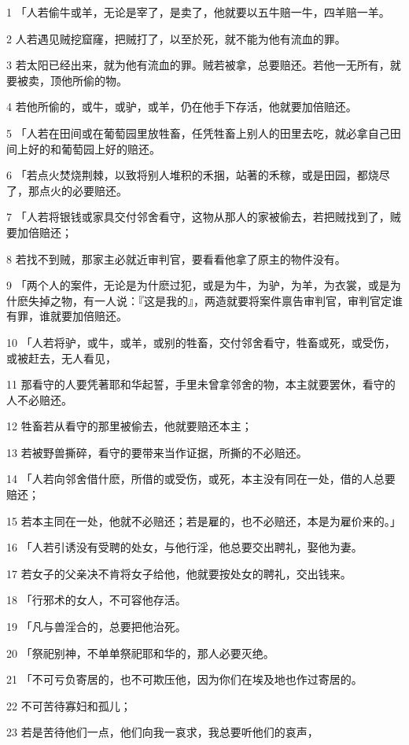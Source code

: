 \par 1 「人若偷牛或羊，无论是宰了，是卖了，他就要以五牛赔一牛，四羊赔一羊。
\par 2 人若遇见贼挖窟窿，把贼打了，以至於死，就不能为他有流血的罪。
\par 3 若太阳已经出来，就为他有流血的罪。贼若被拿，总要赔还。若他一无所有，就要被卖，顶他所偷的物。
\par 4 若他所偷的，或牛，或驴，或羊，仍在他手下存活，他就要加倍赔还。
\par 5 「人若在田间或在葡萄园里放牲畜，任凭牲畜上别人的田里去吃，就必拿自己田间上好的和葡萄园上好的赔还。
\par 6 「若点火焚烧荆棘，以致将别人堆积的禾捆，站著的禾稼，或是田园，都烧尽了，那点火的必要赔还。
\par 7 「人若将银钱或家具交付邻舍看守，这物从那人的家被偷去，若把贼找到了，贼要加倍赔还；
\par 8 若找不到贼，那家主必就近审判官，要看看他拿了原主的物件没有。
\par 9 「两个人的案件，无论是为什麽过犯，或是为牛，为驴，为羊，为衣裳，或是为什麽失掉之物，有一人说：『这是我的』，两造就要将案件禀告审判官，审判官定谁有罪，谁就要加倍赔还。
\par 10 「人若将驴，或牛，或羊，或别的牲畜，交付邻舍看守，牲畜或死，或受伤，或被赶去，无人看见，
\par 11 那看守的人要凭著耶和华起誓，手里未曾拿邻舍的物，本主就要罢休，看守的人不必赔还。
\par 12 牲畜若从看守的那里被偷去，他就要赔还本主；
\par 13 若被野兽撕碎，看守的要带来当作证据，所撕的不必赔还。
\par 14 「人若向邻舍借什麽，所借的或受伤，或死，本主没有同在一处，借的人总要赔还；
\par 15 若本主同在一处，他就不必赔还；若是雇的，也不必赔还，本是为雇价来的。」
\par 16 「人若引诱没有受聘的处女，与他行淫，他总要交出聘礼，娶他为妻。
\par 17 若女子的父亲决不肯将女子给他，他就要按处女的聘礼，交出钱来。
\par 18 「行邪术的女人，不可容他存活。
\par 19 「凡与兽淫合的，总要把他治死。
\par 20 「祭祀别神，不单单祭祀耶和华的，那人必要灭绝。
\par 21 「不可亏负寄居的，也不可欺压他，因为你们在埃及地也作过寄居的。
\par 22 不可苦待寡妇和孤儿；
\par 23 若是苦待他们一点，他们向我一哀求，我总要听他们的哀声，
